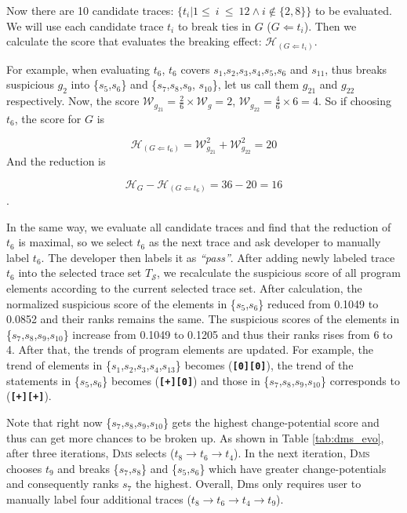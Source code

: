 Now there are 10 candidate traces: $\{t_{i} | 1\leq~i~\leq~12 \wedge i\notin\{2,8\}\}$ to be evaluated. We will use each candidate trace $t_{i}$ to
break ties in $G$ ($G \Leftarrow t_{i}$). Then we calculate the score that evaluates the breaking effect: $\mathcal{H}_{(G \Leftarrow t_{i})}$.

For example, when evaluating $t_6$, $t_{6}$ covers $s_{1}$,$s_{2}$,$s_{3}$,$s_{4}$,$s_{5}$,$s_{6}$ and $s_{11}$, thus breaks suspicious $g_{2}$
into \{$s_{5}$,$s_{6}$\} and \{$s_{7}$,$s_{8}$,$s_{9}$, $s_{10}$\}, let us call them $g_{21}$ and $g_{22}$ respectively.
Now, the score $\mathcal{W}_{g_{21}} = \frac{2}{6} \times \mathcal{W}_{g} = 2$, $\mathcal{W}_{g_{22}} = \frac{4}{6} \times 6 = 4$.
So if choosing $t_{6}$, the score for $G$ is 

\[\mathcal{H}_{(G \Leftarrow t_{6})} = \mathcal{W}_{g_{21}}^{2} + \mathcal{W}_{g_{22}}^{2} = 20\]
And the reduction is 

\[\mathcal{H}_{G} - \mathcal{H}_{(G \Leftarrow t_{6})} = 36 - 20 = 16\].

In the same way, we evaluate all candidate traces and find that the reduction of $t_{6}$ is maximal, so we select $t_{6}$ as the next trace and ask developer to manually label $t_{6}$.
The developer then labels it as {\em ``pass''}.  After adding newly labeled trace $t_{6}$ into the selected trace set $T_{\mathcal{S}}$, we recalculate the suspicious score
of all program elements according to the current selected trace set. After calculation, the normalized suspicious score of the elements in \{$s_{5}$,$s_{6}$\} reduced from 0.1049 to 0.0852 and their ranks remains the same. The suspicious scores of
the elements in \{$s_{7}$,$s_{8}$,$s_{9}$,$s_{10}$\} increase from 0.1049 to 0.1205 and thus their ranks rises from 6 to 4. After that, the trends of program elements are updated. For example, the trend of elements in \{$s_{1}$,$s_{2}$,$s_{3}$,$s_{4}$,$s_{13}$\} becomes ({\bf\texttt{[0]}}{\bf\texttt{[0]}}), the trend
of the statements in \{$s_{5}$,$s_{6}$\} becomes ({\bf\texttt{[+]}}{\bf\texttt{[0]}}) and those in \{$s_{7}$,$s_{8}$,$s_{9}$,$s_{10}$\} corresponds to ({\bf\texttt{[+]}}{\bf\texttt{[+]}}).


Note that right now \{$s_{7}$,$s_{8}$,$s_{9}$,$s_{10}$\} gets the highest change-potential score and thus can get more chances to be broken up.
As shown in Table \ref{tab:dms_evo},
after three iterations,
\textsc{Dms} selects (\texttt{$t_{8}$}$\rightarrow$\texttt{$t_{6}$}$\rightarrow$\texttt{$t_{4}$}). In the next iteration, \textsc{Dms} chooses $t_{9}$ and breaks \{$s_{7}$,$s_{8}$\} and \{$s_{5}$,$s_{6}$\} which have greater change-potentials and consequently ranks $s_7$ the highest. Overall, {\sc Dms} only requires user to manually label four additional traces (\texttt{$t_{8}$}$\rightarrow$\texttt{$t_{6}$}$\rightarrow$\texttt{$t_{4}$}$\rightarrow$\texttt{$t_{9}$}).

